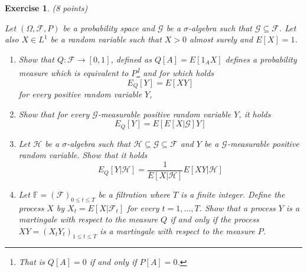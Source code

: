 \documentclass[DIV=classic,a4paper,10pt]{scrartcl}
\newtheorem{exercise}[theorem]{Exercise}
\theoremstyle{nonumberplain}
\numberwithin{equation}{section}
\begin{document}
\begin{exercise}(8 points)


    Let $(\Omega,\mathcal{F},P)$ be a probability space and $\mathcal{G}$ be a $\sigma$-algebra such that $\mathcal{G}\subseteq \mathcal{F}$.
    Let also $X \in L^1$ be a random variable such that $X>0$ almost surely and $E[X]=1$.

    \begin{enumerate}[label=\textit{(\roman*)}]
        \item Show that $Q:\mathcal{F}\to [0,1]$, defined as $Q[A]=E[1_A X]$ defines a probability measure which is equivalent to $P$\footnote{That is $Q[A]=0$ if and only if $P[A]=0$.} and for which holds
            \begin{equation*}
                E_{Q}\left[ Y \right]=E\left[ XY \right]
            \end{equation*}
            for every positive random variable $Y$,
        \item Show that for every $\mathcal{G}$-measurable positive random variable $Y$, it holds
            \begin{equation*}
                E_{Q}\left[ Y \right]=E\left[ E\left[ X|\mathcal{G} \right] Y\right]
            \end{equation*}
        \item Let $\mathcal{H}$ be a $\sigma$-algebra such that $\mathcal{H}\subseteq \mathcal{G}\subseteq \mathcal{F}$ and $Y$ be a $\mathcal{G}$-measurable positive random variable.
            Show that it holds
            \begin{equation*}
                E_Q\left[ Y|\mathcal{H} \right]=\frac{1}{E\left[ X|\mathcal{H} \right]}E\left[ XY |\mathcal{H} \right]
            \end{equation*}
        \item Let $\mathbb{F}=(\mathcal{F})_{0\leq t\leq T}$ be a filtration where $T$ is a finite integer.
            Define the process $X$ by $X_t=E[X|\mathcal{F}_t]$ for every $t=1,\ldots,T$.
            Show that a process $Y$ is a martingale with respect to the measure $Q$ if and only if the process $XY=(X_tY_t)_{1\leq t\leq T}$ is a martingale with respect to the measure $P$.

    \end{enumerate}
\end{exercise}
\end{document}
